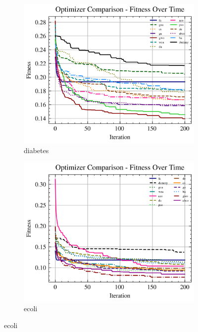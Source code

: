 \begin{figure}[htp]
    \begin{subfigure}[b]{0.45\textwidth}
        \includegraphics[width=\textwidth]{imagenes/fitness_charts/img/binary/diabetes/optimizers_fitness_svc.png}
        \caption{diabetes}
        \label{fig:convergencia_diabetes_svc}
    \end{subfigure}
    \begin{subfigure}[b]{0.45\textwidth}
        \includegraphics[width=\textwidth]{imagenes/fitness_charts/img/binary/ecoli/optimizers_fitness_svc.png}
        \caption{ecoli}
        \label{fig:convergencia_ecoli_svc}
    \end{subfigure}


\end{figure}
